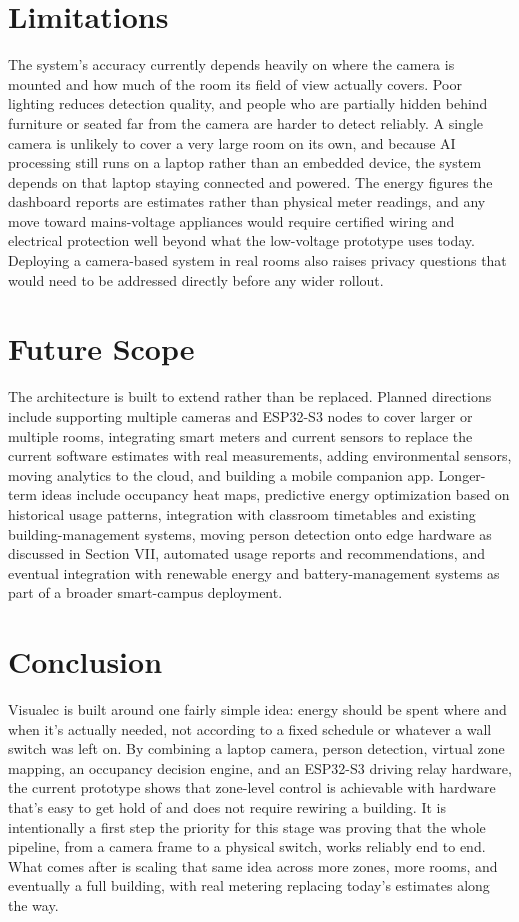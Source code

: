 \documentclass[conference]{IEEEtran}
\begin{document}
\section{Limitations}
The system's accuracy currently depends heavily on where the camera is mounted and how much of the room its field of view actually covers. Poor lighting reduces detection quality, and people who are partially hidden behind furniture or seated far from the camera are harder to detect reliably. A single camera is unlikely to cover a very large room on its own, and because AI processing still runs on a laptop rather than an embedded device, the system depends on that laptop staying connected and powered. The energy figures the dashboard reports are estimates rather than physical meter readings, and any move toward mains-voltage appliances would require certified wiring and electrical protection well beyond what the low-voltage prototype uses today. Deploying a camera-based system in real rooms also raises privacy questions that would need to be addressed directly before any wider rollout.

\section{Future Scope}
The architecture is built to extend rather than be replaced. Planned directions include supporting multiple cameras and ESP32-S3 nodes to cover larger or multiple rooms, integrating smart meters and current sensors to replace the current software estimates with real measurements, adding environmental sensors, moving analytics to the cloud, and building a mobile companion app. Longer-term ideas include occupancy heat maps, predictive energy optimization based on historical usage patterns, integration with classroom timetables and existing building-management systems, moving person detection onto edge hardware as discussed in Section VII, automated usage reports and recommendations, and eventual integration with renewable energy and battery-management systems as part of a broader smart-campus deployment.

\section{Conclusion}
Visualec is built around one fairly simple idea: energy should be spent where and when it's actually needed, not according to a fixed schedule or whatever a wall switch was left on. By combining a laptop camera, person detection, virtual zone mapping, an occupancy decision engine, and an ESP32-S3 driving relay hardware, the current prototype shows that zone-level control is achievable with hardware that's easy to get hold of and does not require rewiring a building. It is intentionally a first step the priority for this stage was proving that the whole pipeline, from a camera frame to a physical switch, works reliably end to end. What comes after is scaling that same idea across more zones, more rooms, and eventually a full building, with real metering replacing today's estimates along the way.
\end{document}

